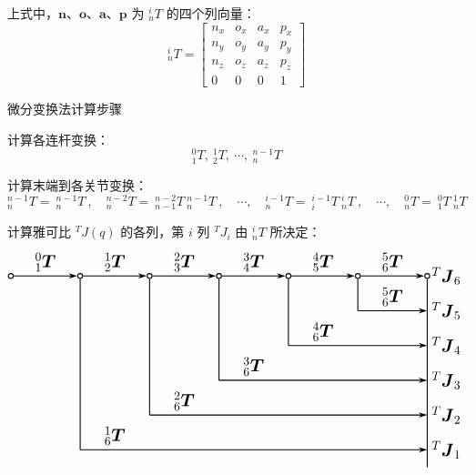 上式中，$\boldsymbol{n}$、$\boldsymbol{o}$、$\boldsymbol{a}$、$\boldsymbol{p}$ 为 ${}_n^iT$ 的四个列向量：
$$
{}_n^iT = \begin{bmatrix} n_x & o_x & a_x & p_x \\ n_y & o_y & a_y & p_y \\ n_z & o_z & a_z & p_z \\ 0 & 0 & 0 & 1 \end{bmatrix}
$$

\begin{note}
    微分变换法计算步骤

    计算各连杆变换：
    $$_1^0T, \ _2^1T, \ \cdots, \ _n^{n-1}T$$

    计算末端到各关节变换：
    $$_n^{n-1}T = \ _n^{n-1}T \ , \quad _n^{n-2}T = \ _{n-1}^{n-2}T \ _n^{n-1}T \ , \quad \cdots, \quad _n^{i-1}T = \ _i^{i-1}T \ _n^iT \ , \quad \cdots, \quad _n^0T = \ _1^0T \ _n^1T$$

    计算雅可比 $^TJ(q)$ 的各列，第 $i$ 列 $^TJ_i$ 由 $_n^iT$ 所决定：
    $$
    \begin{tikzpicture}[
        >={Stealth[length=2.5mm, width=1.5mm]},
        thick,
        dot/.style={circle, draw, fill=white, inner sep=0pt, minimum size=4pt}
    ]
    \foreach \i in {0,...,6} {
        \node[dot] (n\i) at (2*\i, 0) {};
    }
    \foreach \i/\j in {0/1, 1/2, 2/3, 3/4, 4/5, 5/6} {
        \draw[->] (n\i) -- node[above, font=\Large] {${}^{\i}_{\j}\boldsymbol{T}$} (n\j);
    }
    \draw (n6.south) -- (12, -5.5);
    \node[right, font=\Large] at (12, 0) {${}^T\boldsymbol{J}_6$};
    \foreach \i/\y in {1/-5, 2/-4, 3/-3, 4/-2, 5/-1} {
        \draw (n\i.south) -- (2*\i, \y);
        \draw[->] (2*\i, \y) -- (12, \y);
        \node[above, font=\Large] at (2*\i + 1, \y) {${}^{\i}_6\boldsymbol{T}$};
        \node[right, font=\Large] at (12, \y) {${}^T\boldsymbol{J}_{\i}$};
    }
    \end{tikzpicture}
    $$
\end{note}

